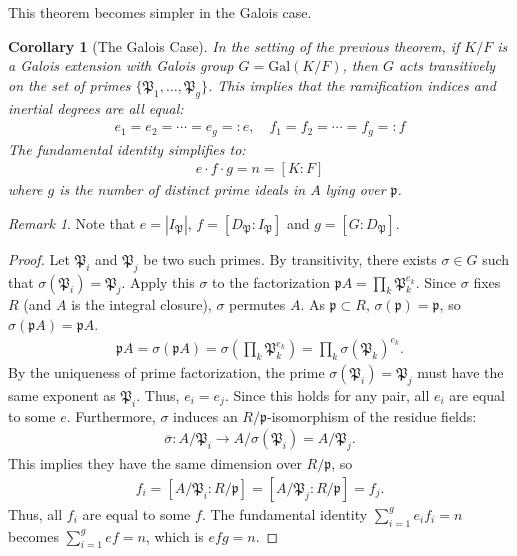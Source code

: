 \documentclass[12pt]{article}
\theoremstyle{plain}
\newtheorem{corollary}[theorem]{Corollary}
\theoremstyle{remark}
\newtheorem*{remark}{Remark}
\theoremstyle{definition}
\begin{document}
This theorem becomes simpler in the Galois case.

\begin{corollary}[The Galois Case]
    In the setting of the previous theorem, if $K/F$ is a Galois extension with Galois group $G = \mathrm{Gal}(K/F)$, then $G$ acts transitively on the set of primes $\{\mathfrak{P}_1, \dots, \mathfrak{P}_g\}$. This implies that the ramification indices and inertial degrees are all equal:
    \begin{align*}
        e_1 = e_2 = \cdots = e_g =: e,\quad f_1 = f_2 = \cdots = f_g =: f
    \end{align*}
    The fundamental identity simplifies to:
    \begin{align*}
        e \cdot f \cdot g = n = [K:F]
    \end{align*}
    where $g$ is the number of distinct prime ideals in $A$ lying over $\mathfrak{p}$.
\end{corollary}
\begin{remark}
    Note that $e=|I_\mathfrak{P}|$, $f=[D_\mathfrak{P}:I_\mathfrak{P}]$ and $g=[G:D_\mathfrak{P}]$.
\end{remark}
\begin{proof}
    Let $\mathfrak{P}_i$ and $\mathfrak{P}_j$ be two such primes. By transitivity, there exists $\sigma \in G$ such that $\sigma(\mathfrak{P}_i) = \mathfrak{P}_j$. Apply this $\sigma$ to the factorization $\mathfrak{p}A = \prod_k \mathfrak{P}_k^{e_k}$. Since $\sigma$ fixes $R$ (and $A$ is the integral closure), $\sigma$ permutes $A$. As $\mathfrak{p} \subset R$, $\sigma(\mathfrak{p}) = \mathfrak{p}$, so $\sigma(\mathfrak{p}A) = \mathfrak{p}A$.
    \begin{align*}
        \mathfrak{p}A = \sigma(\mathfrak{p}A) = \sigma\left(\prod_k \mathfrak{P}_k^{e_k}\right) = \prod_k \sigma(\mathfrak{P}_k)^{e_k}.
    \end{align*}
    By the uniqueness of prime factorization, the prime $\sigma(\mathfrak{P}_i) = \mathfrak{P}_j$ must have the same exponent as $\mathfrak{P}_i$. Thus, $e_i = e_j$. Since this holds for any pair, all $e_i$ are equal to some $e$. Furthermore, $\sigma$ induces an $R/\mathfrak{p}$-isomorphism of the residue fields:
    \begin{align*}
        \overline{\sigma}: A/\mathfrak{P}_i \to A/\sigma(\mathfrak{P}_i) = A/\mathfrak{P}_j.
    \end{align*}
    This implies they have the same dimension over $R/\mathfrak{p}$, so
    \begin{align*}
        f_i = [A/\mathfrak{P}_i : R/\mathfrak{p}] = [A/\mathfrak{P}_j : R/\mathfrak{p}] = f_j.
    \end{align*}
    Thus, all $f_i$ are equal to some $f$. The fundamental identity $\sum_{i=1}^g e_i f_i = n$ becomes $\sum_{i=1}^g ef = n$, which is $efg = n$.
\end{proof}
\end{document}
